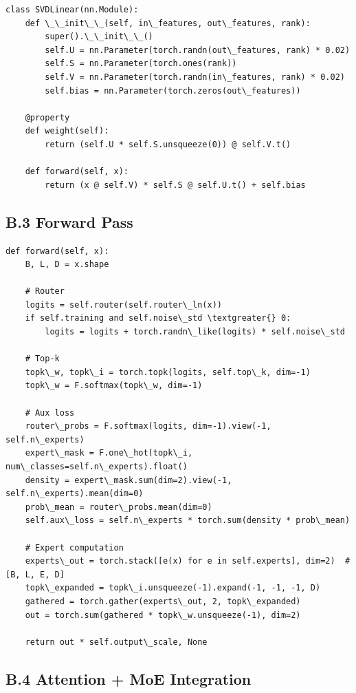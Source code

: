 \begin{lstlisting}
class SVDLinear(nn.Module):
    def \_\_init\_\_(self, in\_features, out\_features, rank):
        super().\_\_init\_\_()
        self.U = nn.Parameter(torch.randn(out\_features, rank) * 0.02)
        self.S = nn.Parameter(torch.ones(rank))
        self.V = nn.Parameter(torch.randn(in\_features, rank) * 0.02)
        self.bias = nn.Parameter(torch.zeros(out\_features))
    
    @property
    def weight(self):
        return (self.U * self.S.unsqueeze(0)) @ self.V.t()
    
    def forward(self, x):
        return (x @ self.V) * self.S @ self.U.t() + self.bias
\end{lstlisting}

\subsection{B.3 Forward Pass}

\begin{lstlisting}
def forward(self, x):
    B, L, D = x.shape
    
    # Router
    logits = self.router(self.router\_ln(x))
    if self.training and self.noise\_std \textgreater{} 0:
        logits = logits + torch.randn\_like(logits) * self.noise\_std
    
    # Top-k
    topk\_w, topk\_i = torch.topk(logits, self.top\_k, dim=-1)
    topk\_w = F.softmax(topk\_w, dim=-1)
    
    # Aux loss
    router\_probs = F.softmax(logits, dim=-1).view(-1, self.n\_experts)
    expert\_mask = F.one\_hot(topk\_i, num\_classes=self.n\_experts).float()
    density = expert\_mask.sum(dim=2).view(-1, self.n\_experts).mean(dim=0)
    prob\_mean = router\_probs.mean(dim=0)
    self.aux\_loss = self.n\_experts * torch.sum(density * prob\_mean)
    
    # Expert computation
    experts\_out = torch.stack([e(x) for e in self.experts], dim=2)  # [B, L, E, D]
    topk\_expanded = topk\_i.unsqueeze(-1).expand(-1, -1, -1, D)
    gathered = torch.gather(experts\_out, 2, topk\_expanded)
    out = torch.sum(gathered * topk\_w.unsqueeze(-1), dim=2)
    
    return out * self.output\_scale, None
\end{lstlisting}

\subsection{B.4 Attention + MoE Integration}

